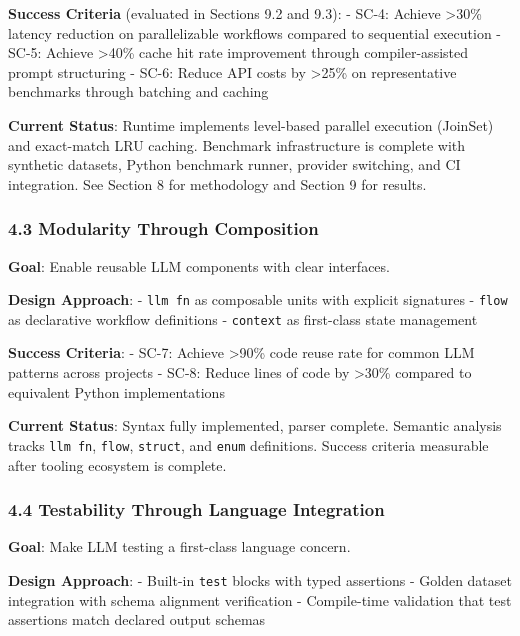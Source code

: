 \documentclass[
]{article}
\newcommand{\passthrough}[1]{#1}
\begin{document}
\textbf{Success Criteria} (evaluated in Sections 9.2 and 9.3): - SC-4:
Achieve \textgreater30\% latency reduction on parallelizable workflows
compared to sequential execution - SC-5: Achieve \textgreater40\% cache
hit rate improvement through compiler-assisted prompt structuring -
SC-6: Reduce API costs by \textgreater25\% on representative benchmarks
through batching and caching

\textbf{Current Status}: Runtime implements level-based parallel
execution (JoinSet) and exact-match LRU caching. Benchmark
infrastructure is complete with synthetic datasets, Python benchmark
runner, provider switching, and CI integration. See Section 8 for
methodology and Section 9 for results.

\subsubsection{4.3 Modularity Through
Composition}\label{modularity-through-composition}

\textbf{Goal}: Enable reusable LLM components with clear interfaces.

\textbf{Design Approach}: - \passthrough{\lstinline!llm fn!} as
composable units with explicit signatures -
\passthrough{\lstinline!flow!} as declarative workflow definitions -
\passthrough{\lstinline!context!} as first-class state management

\textbf{Success Criteria}: - SC-7: Achieve \textgreater90\% code reuse
rate for common LLM patterns across projects - SC-8: Reduce lines of
code by \textgreater30\% compared to equivalent Python implementations

\textbf{Current Status}: Syntax fully implemented, parser complete.
Semantic analysis tracks \passthrough{\lstinline!llm fn!},
\passthrough{\lstinline!flow!}, \passthrough{\lstinline!struct!}, and
\passthrough{\lstinline!enum!} definitions. Success criteria measurable
after tooling ecosystem is complete.

\subsubsection{4.4 Testability Through Language
Integration}\label{testability-through-language-integration}

\textbf{Goal}: Make LLM testing a first-class language concern.

\textbf{Design Approach}: - Built-in \passthrough{\lstinline!test!}
blocks with typed assertions - Golden dataset integration with schema
alignment verification - Compile-time validation that test assertions
match declared output schemas
\end{document}
